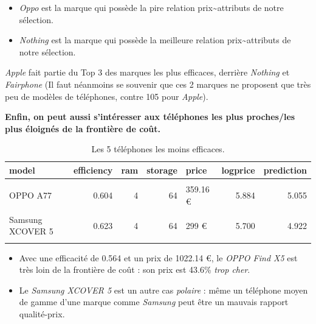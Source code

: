 \documentclass[
  12pt,
]{report}
\providecommand{\tightlist}{%
  \setlength{\itemsep}{0pt}\setlength{\parskip}{0pt}}\usepackage{longtable,booktabs,array}
\begin{document}
\begin{itemize}
\tightlist
\item
  \emph{Oppo} est la marque qui possède la pire relation
  prix\textasciitilde attributs de notre sélection.
\item
  \emph{Nothing} est la marque qui possède la meilleure relation
  prix\textasciitilde attributs de notre sélection.
\end{itemize}

\emph{Apple} fait partie du Top 3 des marques les plus efficaces,
derrière \emph{Nothing} et \emph{Fairphone} (Il faut néanmoins se
souvenir que ces 2 marques ne proposent que très peu de modèles de
téléphones, contre 105 pour \emph{Apple}).

\textbf{Enfin, on peut aussi s'intéresser aux téléphones les plus
proches/les plus éloignés de la frontière de coût.}

\begin{table}[!h]
\centering
\caption{\label{tab:worst}Les 5 téléphones les moins efficaces.}
\centering
\begin{tabular}[t]{lrrrlrr}
\toprule
\textbf{model} & \textbf{efficiency} & \textbf{ram} & \textbf{storage} & \textbf{price} & \textbf{logprice} & \textbf{prediction}\\
\midrule
\cellcolor{gray!10}{MOTOROLA Razr} & \cellcolor{gray!10}{0.600} & \cellcolor{gray!10}{8} & \cellcolor{gray!10}{256} & \cellcolor{gray!10}{853.6 €} & \cellcolor{gray!10}{6.749} & \cellcolor{gray!10}{5.909}\\
OPPO A77 & 0.604 & 4 & 64 & 359.16 € & 5.884 & 5.055\\
\cellcolor{gray!10}{OPPO Find X5} & \cellcolor{gray!10}{0.605} & \cellcolor{gray!10}{8} & \cellcolor{gray!10}{256} & \cellcolor{gray!10}{1022.14 €} & \cellcolor{gray!10}{6.930} & \cellcolor{gray!10}{6.102}\\
Samsung XCOVER 5 & 0.623 & 4 & 64 & 299 € & 5.700 & 4.922\\
\cellcolor{gray!10}{Samsung Galaxy S22+} & \cellcolor{gray!10}{0.628} & \cellcolor{gray!10}{8} & \cellcolor{gray!10}{128} & \cellcolor{gray!10}{1000.33 €} & \cellcolor{gray!10}{6.908} & \cellcolor{gray!10}{6.142}\\
\bottomrule
\end{tabular}
\end{table}

\newpage

\begin{itemize}
\item
  Avec une efficacité de 0.564 et un prix de 1022.14 €, le \emph{OPPO
  Find X5} est très loin de la frontière de coût : son prix est 43.6\%
  \emph{trop cher}.
\item
  Le \emph{Samsung XCOVER 5} est un autre cas \emph{polaire} : même un
  téléphone moyen de gamme d'une marque comme \emph{Samsung} peut être
  un mauvais rapport qualité-prix.
\end{itemize}
\end{document}
